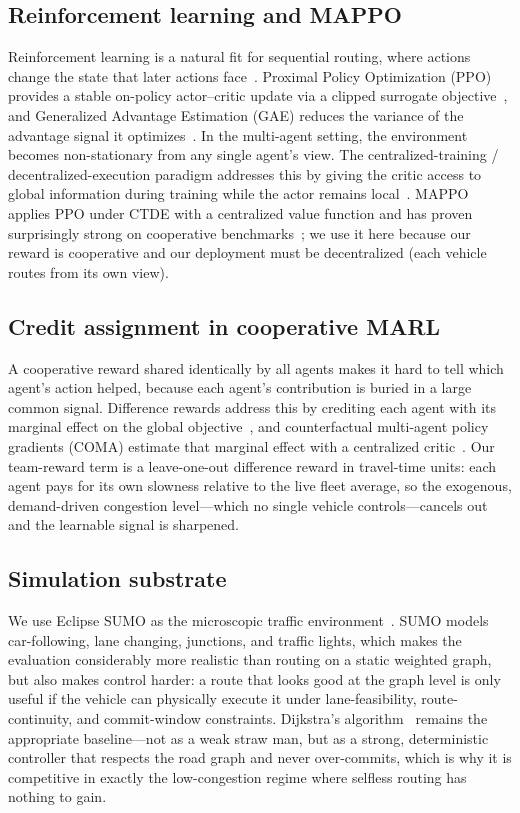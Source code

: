 \subsection{Reinforcement learning and MAPPO}
Reinforcement learning is a natural fit for sequential routing, where actions change the
state that later actions face~\cite{mnih2015human}. Proximal Policy Optimization (PPO)
provides a stable on-policy actor--critic update via a clipped surrogate
objective~\cite{schulman2017ppo}, and Generalized Advantage Estimation (GAE) reduces the
variance of the advantage signal it optimizes~\cite{schulman2016gae}. In the multi-agent
setting, the environment becomes non-stationary from any single agent's view. The
centralized-training / decentralized-execution paradigm addresses this by giving the
critic access to global information during training while the actor remains
local~\cite{lowe2017maddpg}. MAPPO applies PPO under CTDE with a centralized value
function and has proven surprisingly strong on cooperative
benchmarks~\cite{yu2022mappo}; we use it here because our reward is cooperative and our
deployment must be decentralized (each vehicle routes from its own view).

\subsection{Credit assignment in cooperative MARL}
A cooperative reward shared identically by all agents makes it hard to tell which agent's
action helped, because each agent's contribution is buried in a large common signal.
Difference rewards address this by crediting each agent with its marginal effect on the
global objective~\cite{wolpert2001collectives}, and counterfactual multi-agent policy
gradients (COMA) estimate that marginal effect with a centralized
critic~\cite{foerster2018coma}. Our team-reward term is a leave-one-out difference reward
in travel-time units: each agent pays for its own slowness relative to the live fleet
average, so the exogenous, demand-driven congestion level---which no single vehicle
controls---cancels out and the learnable signal is sharpened.

\subsection{Simulation substrate}
We use Eclipse SUMO as the microscopic traffic environment~\cite{lopez2018sumo,krajzewicz2012recent}.
SUMO models car-following, lane changing, junctions, and traffic lights, which makes the
evaluation considerably more realistic than routing on a static weighted graph, but also
makes control harder: a route that looks good at the graph level is only useful if the
vehicle can physically execute it under lane-feasibility, route-continuity, and
commit-window constraints. Dijkstra's algorithm~\cite{dijkstra1959note} remains the
appropriate baseline---not as a weak straw man, but as a strong, deterministic controller
that respects the road graph and never over-commits, which is why it is competitive in
exactly the low-congestion regime where selfless routing has nothing to gain.
